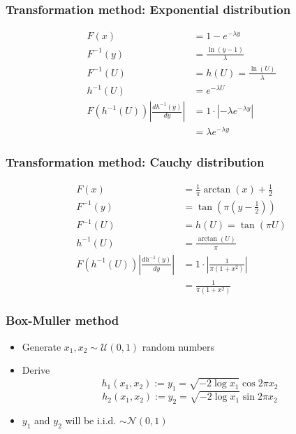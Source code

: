 \documentclass[10pt, serif, mathserif]{beamer}
\begin{document}
\begin{frame}
  \frametitle{Transformation method: Exponential distribution}
  \begin{align*}
    F(x) &= 1-e^{-\lambda y} \\
    F^{-1}(y) &= \frac{\ln(y - 1)}{\lambda} \\
    F^{-1}(U) &= h(U) = \frac{\ln(U)}{\lambda} \\
    h^{-1}(U) &= e^{-\lambda U} \\
    F(h^{-1}(U)) \left| \frac{dh^{-1}(y)}{dy}\right| &= 1\cdot\left|-\lambda e^{-\lambda y}\right| \\
                                                     &= \lambda e^{-\lambda y}
  \end{align*}
\end{frame}
\begin{frame}
  \frametitle{Transformation method: Cauchy distribution}
  \begin{align*}
    F(x) &= \frac{1}{\pi} \arctan(x)+\frac{1}{2} \\
    F^{-1}(y) &= \tan\left(\pi\left(y - \frac{1}{2}\right)\right) \\
    F^{-1}(U) &= h(U) = \tan(\pi U) \\
    h^{-1}(U) &= \frac{\arctan(U)}{\pi} \\
    F(h^{-1}(U)) \left|\frac{dh^{-1}(y)}{dy}\right| &= 1\cdot\left|\frac{1}{\pi(1+x^2)}\right| \\
                                                    &= \frac{1}{\pi(1+x^2)}
  \end{align*}
\end{frame}

\begin{frame}
  \frametitle{Box-Muller method}
  \begin{itemize}
  	\item Generate $x_1, x_2 \sim \mathcal{U}(0,1)$ random numbers
  	\item Derive
  	  \[ h_1(x_1, x_2) := y_1 = \sqrt{-2 \log x_1} \cos{2\pi x_2} \]
  	  \[ h_2(x_1, x_2) := y_2 = \sqrt{-2 \log x_1} \sin{2\pi x_2} \] 
	\item $y_1$ and $y_2$ will be i.i.d. $\sim \mathcal{N}(0,1)$
  \end{itemize}
\end{frame}
\end{document}

